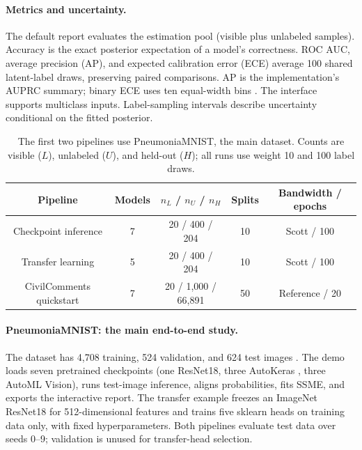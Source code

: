 \documentclass[twoside,11pt]{article}
\begin{document}
\paragraph{Metrics and uncertainty.}
The default report evaluates the estimation pool (visible plus unlabeled samples). Accuracy is the exact posterior expectation of a model's correctness. ROC AUC, average precision (AP), and expected calibration error (ECE) average 100 shared latent-label draws, preserving paired comparisons. AP is the implementation's AUPRC summary; binary ECE uses ten equal-width bins \citep{guo2017}. The interface supports multiclass inputs. Label-sampling intervals describe uncertainty conditional on the fitted posterior.

\begin{table}[!ht]
\centering\small
\renewcommand{\arraystretch}{1.12}
\begin{tabular*}{\textwidth}{@{\extracolsep{\fill}}ccccc@{}}
\toprule
Pipeline & Models & $n_L$ / $n_U$ / $n_H$ & Splits & Bandwidth / epochs\\
\midrule
Checkpoint inference & 7 & 20 / 400 / 204 & 10 & Scott / 100\\
Transfer learning & 5 & 20 / 400 / 204 & 10 & Scott / 100\\
CivilComments quickstart & 7 & 20 / 1,000 / 66,891 & 50 & Reference / 20\\
\bottomrule
\end{tabular*}
\caption{The first two pipelines use PneumoniaMNIST, the main dataset. Counts are visible ($L$), unlabeled ($U$), and held-out ($H$); all runs use weight 10 and 100 label draws.}
\label{tab:protocol}
\end{table}

\paragraph{PneumoniaMNIST: the main end-to-end study.}
The dataset has 4,708 training, 524 validation, and 624 test images \citep{yang2023}. The demo loads seven pretrained checkpoints (one ResNet18, three AutoKeras \citep{jin2023}, three AutoML Vision), runs test-image inference, aligns probabilities, fits SSME, and exports the interactive report. The transfer example freezes an ImageNet ResNet18 \citep{he2016} for 512-dimensional features and trains five sklearn heads on training data only, with fixed hyperparameters. Both pipelines evaluate test data over seeds 0--9; validation is unused for transfer-head selection.
\end{document}
